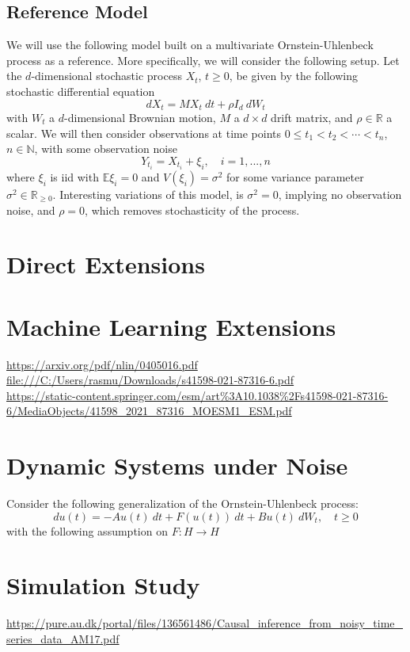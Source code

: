 \documentclass[11pt, a4paper]{memoir}
\theoremstyle{break}
\theoremstyle{break}
\theoremstyle{nonumberplain}
\begin{document}
\subsection*{Reference Model}
We will use the following model built on a multivariate Ornstein-Uhlenbeck process as a reference. More specifically, we will consider the following setup. Let the $d$-dimensional stochastic process $X_t$, $t\geqslant 0$, be given by the following stochastic differential equation
$$dX_t=M X_t\ dt+\rho I_d\ dW_t$$
with $W_t$ a $d$-dimensional  Brownian motion, $M$ a $d\times d$ drift matrix, and $\rho\in \mathbb{R}$ a scalar. We will then consider observations at time points $0\leqslant t_1<t_2<\cdots <t_n$, $n\in \mathbb{N}$, with some observation noise
$$Y_{t_i}=X_{t_i}+\xi_i,\quad i=1,...,n$$
where $\xi_i$ is iid with $\mathbb{E} \xi_i=0$ and $V(\xi_i)=\sigma^2$ for some variance parameter $\sigma^2\in \mathbb{R}_{\geqslant 0}$. Interesting variations of this model, is $\sigma^2=0$, implying no observation noise, and $\rho=0$, which removes stochasticity of the process.
\section{Direct Extensions}


\section{Machine Learning Extensions}
\url{https://arxiv.org/pdf/nlin/0405016.pdf}\\[5pt]
\url{file:///C:/Users/rasmu/Downloads/s41598-021-87316-6.pdf}\\[5pt]
\url{https://static-content.springer.com/esm/art%3A10.1038%2Fs41598-021-87316-6/MediaObjects/41598_2021_87316_MOESM1_ESM.pdf}

\section{Dynamic Systems under Noise}
Consider the following generalization of the Ornstein-Uhlenbeck process:
$$du(t)=-Au(t)\ dt+F(u(t))\ dt+B u(t)\ dW_t,\quad t\geqslant 0$$
with the following assumption on $F:H\to H$
\cite{StableManifoldStoc} 

\section{Simulation Study}
\url{https://pure.au.dk/portal/files/136561486/Causal_inference_from_noisy_time_series_data_AM17.pdf}






\end{document}
